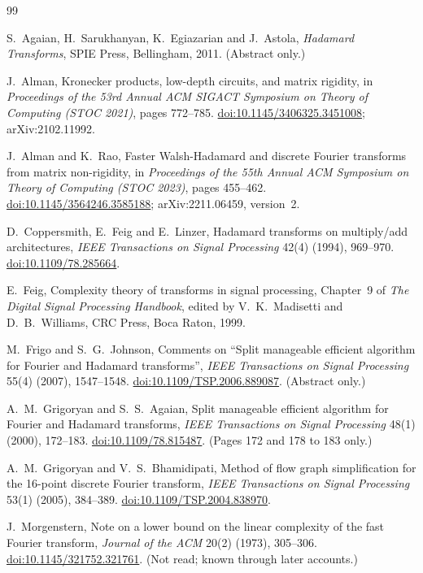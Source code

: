 \documentclass[10pt]{article}
\theoremstyle{remark}
\begin{document}
\begin{thebibliography}{99}
\setlength{\itemsep}{1pt}\setlength{\parskip}{0pt}

S.~Agaian, H.~Sarukhanyan, K.~Egiazarian and J.~Astola, \emph{Hadamard Transforms}, SPIE Press, Bellingham,
2011. (Abstract only.)

J.~Alman, Kronecker products, low-depth circuits, and matrix rigidity, in \emph{Proceedings of the 53rd Annual
ACM SIGACT Symposium on Theory of Computing (STOC 2021)}, pages 772--785.
\href{https://doi.org/10.1145/3406325.3451008}{doi:10.1145/3406325.3451008}; arXiv:2102.11992.

J.~Alman and K.~Rao, Faster Walsh-Hadamard and discrete Fourier transforms from matrix non-rigidity, in
\emph{Proceedings of the 55th Annual ACM Symposium on Theory of Computing (STOC 2023)}, pages 455--462.
\href{https://doi.org/10.1145/3564246.3585188}{doi:10.1145/3564246.3585188}; arXiv:2211.06459, version~2.

D.~Coppersmith, E.~Feig and E.~Linzer, Hadamard transforms on multiply/add architectures, \emph{IEEE
Transactions on Signal Processing} 42(4) (1994), 969--970.
\href{https://doi.org/10.1109/78.285664}{doi:10.1109/78.285664}.

E.~Feig, Complexity theory of transforms in signal processing, Chapter~9 of \emph{The Digital Signal
Processing Handbook}, edited by V.~K.~Madisetti and D.~B.~Williams, CRC Press, Boca Raton, 1999.

M.~Frigo and S.~G.~Johnson, Comments on ``Split manageable efficient algorithm for Fourier and Hadamard
transforms'', \emph{IEEE Transactions on Signal Processing} 55(4) (2007), 1547--1548.
\href{https://doi.org/10.1109/TSP.2006.889087}{doi:10.1109/TSP.2006.889087}. (Abstract only.)

A.~M.~Grigoryan and S.~S.~Agaian, Split manageable efficient algorithm for Fourier and Hadamard transforms,
\emph{IEEE Transactions on Signal Processing} 48(1) (2000), 172--183.
\href{https://doi.org/10.1109/78.815487}{doi:10.1109/78.815487}. (Pages 172 and 178 to 183 only.)

A.~M.~Grigoryan and V.~S.~Bhamidipati, Method of flow graph simplification for the 16-point discrete Fourier
transform, \emph{IEEE Transactions on Signal Processing} 53(1) (2005), 384--389.
\href{https://doi.org/10.1109/TSP.2004.838970}{doi:10.1109/TSP.2004.838970}.

J.~Morgenstern, Note on a lower bound on the linear complexity of the fast Fourier transform, \emph{Journal
of the ACM} 20(2) (1973), 305--306.
\href{https://doi.org/10.1145/321752.321761}{doi:10.1145/321752.321761}. (Not read; known through
later accounts.)


\end{thebibliography}
\end{document}
